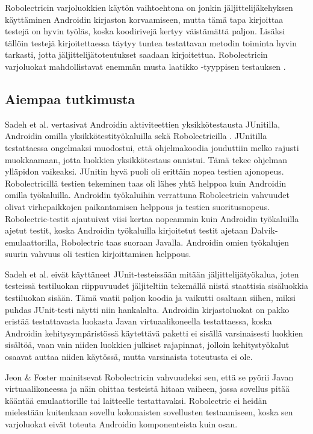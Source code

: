 Robolectricin varjoluokkien käytön vaihtoehtona on jonkin jäljittelijäkehyksen käyttäminen Androidin kirjaston korvaamiseen, mutta tämä tapa kirjoittaa testejä on hyvin työläs, koska koodirivejä kertyy väistämättä paljon. Lisäksi tällöin testejä kirjoitettaessa täytyy tuntea testattavan metodin toiminta hyvin tarkasti, jotta jäljittelijätoteutukset saadaan kirjoitettua. Robolectricin varjoluokat mahdollistavat enemmän musta laatikko -tyyppisen testauksen \cite{robolectric}.

\subsection{Aiempaa tutkimusta}

Sadeh et al. vertasivat Androidin aktiviteettien yksikkötestausta JUnitilla, Androidin omilla yksikkötestityökaluilla sekä Robolectricilla \cite{sadehetal11}. JUnitilla testattaessa ongelmaksi muodostui, että ohjelmakoodia jouduttiin melko rajusti muokkaamaan, jotta luokkien yksikkötestaus onnistui. Tämä tekee ohjelman ylläpidon vaikeaksi. JUnitin hyvä puoli oli erittäin nopea testien ajonopeus. Robolectricillä testien tekeminen taas oli lähes yhtä helppoa kuin Androidin omilla työkaluilla. Androidin työkaluihin verrattuna Robolectricin vahvuudet olivat virhepaikkojen paikantamisen helppous ja testien suoritusnopeus. Robolectric-testit ajautuivat viisi kertaa nopeammin kuin Androidin työkaluilla ajetut testit, koska Androidin työkaluilla kirjoitetut testit ajetaan Dalvik-emulaattorilla, Robolectric taas suoraan Javalla. Androidin omien työkalujen suurin vahvuus oli testien kirjoittamisen helppous.

Sadeh et al. eivät käyttäneet JUnit-testeissään mitään jäljittelijätyökalua, joten testeissä testiluokan riippuvuudet jäljiteltiin tekemällä niistä staattisia sisäluokkia testiluokan sisään. Tämä vaatii paljon koodia ja vaikutti osaltaan siihen, miksi puhdas JUnit-testi näytti niin hankalalta. Androidin kirjastoluokat on pakko eristää testattavasta luokasta Javan virtuaalikoneella testattaessa, koska Androidin kehitysympäristössä käytettävä paketti ei sisällä varsinaisesti luokkien sisältöä, vaan vain niiden luokkien julkiset rajapinnat, jolloin kehitystyökalut osaavat auttaa niiden käytössä, mutta varsinaista toteutusta ei ole.

Jeon \& Foster \cite{troyd} mainitsevat Robolectricin vahvuudeksi sen, että se pyörii Javan virtuaalikoneessa ja näin ohittaa testeistä hitaan vaiheen, jossa sovellus pitää kääntää emulaattorille tai laitteelle testattavaksi. Robolectric ei heidän mielestään kuitenkaan sovellu kokonaisten sovellusten testaamiseen, koska sen varjoluokat eivät toteuta Androidin komponenteista kuin osan.

